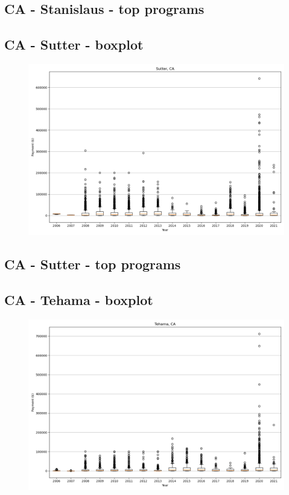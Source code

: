 \subsection*{CA - Stanislaus - top programs}

\newpage
\subsection*{CA - Sutter - boxplot}
\begin{figure}[h]
\centering
\includegraphics[width=7in]{../output/boxplots/counties/Sutter-CA_boxplot.png}
\end{figure}


\subsection*{CA - Sutter - top programs}

\newpage
\subsection*{CA - Tehama - boxplot}
\begin{figure}[h]
\centering
\includegraphics[width=7in]{../output/boxplots/counties/Tehama-CA_boxplot.png}
\end{figure}


